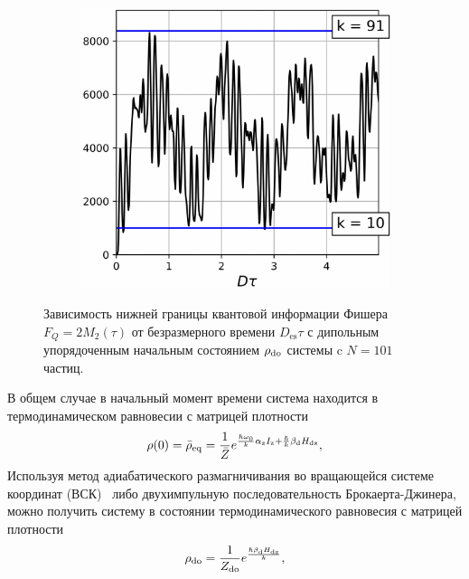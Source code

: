 \begin{figure}[H]
\begin{subfigure}[t]{0.3\textwidth}
    \caption{\protect}
    \label{fig:result-nanopore-do-m2-by-time-beta2}
  \end{subfigure}
  \hfill
  \begin{subfigure}[t]{0.3\textwidth}
    \centering
    \includegraphics[width=\textwidth]{figures/result-nanopore-do-m2-by-time-beta3.png}
    \caption{\protect}
    \label{fig:result-nanopore-do-m2-by-time-beta3}
  \end{subfigure}
  \caption{
    Зависимость нижней границы квантовой информации Фишера $F_Q = 2M_2(\tau)$ от безразмерного времени $D_\mathrm{es}\tau$ с дипольным упорядоченным начальным состоянием $\rho_\mathrm{do}$ системы c $N=101$ частиц.
  }
  \label{fig:result-nanopore-do-m2-by-time-betas}
\end{figure}

В общем случае в начальный момент времени система находится в термодинамическом равновесии с матрицей плотности
%
\begin{equation}\label{eq:rho-eq-hdz}
  \rho(0) = \bar\rho_\mathrm{eq} = \dfrac{1}{\bar Z} e^{ \frac{\hslash \omega_{0}}{k} \alpha_\mathrm{z} I_\mathrm{z} + \frac{\hslash }{k} \beta_\mathrm{d} H_\mathrm{dz} },
\end{equation}
\rhoEqHdzExplanatoryNote
%
Используя  метод адиабатического размагничивания во вращающейся системе координат (ВСК)~\cite{Goldman1970, Slichter1961}
либо двухимпульную последовательность Брокаерта-Джинера,
можно получить систему в состоянии термодинамического равновесия с матрицей плотности
%
\begin{equation}\label{eq:do-state}
 \rho_\mathrm{do} = \frac{1}{Z_\mathrm{do}} e^\frac{\hslash\beta_\mathrm{d} H_\mathrm{dz}}{k},
\end{equation}
\rhoDoExplanatoryNote

